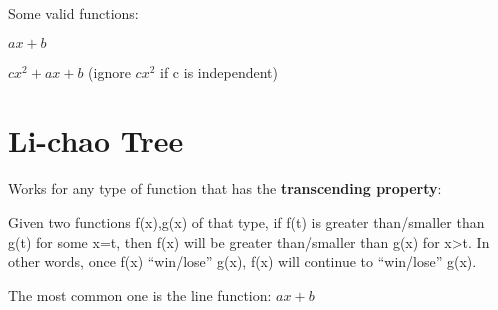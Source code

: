     Some valid functions:

    $ax + b$
    
    $cx^2 + ax + b$ 
    (ignore $cx^2$ if c is independent)


\section{Li-chao Tree}

    Works for any type of function that has the \textbf{transcending property}:

    Given two functions f(x),g(x) of that type, 
    if f(t) is greater than/smaller than g(t) for some x=t,
    then f(x) will be greater than/smaller than g(x) for x>t.
    In other words, once f(x) “win/lose” g(x), f(x) will continue to “win/lose” g(x).

    The most common one is the line function: $ ax + b $
    